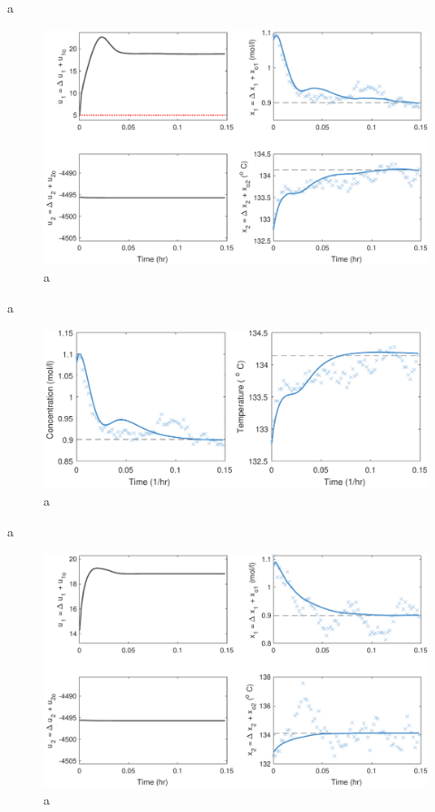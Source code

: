 \documentclass[a4paper,11pt]{book}
\numberwithin{figure}{chapter}
\numberwithin{equation}{chapter}
\numberwithin{table}{chapter}
\theoremstyle{definition}
\begin{document}
a

\begin{figure}[ht] \centering
	\includegraphics[width=\textwidth]{chapter7/lqg01}
	\caption{a}
	\label{fig:lqg01}
\end{figure}

a

\begin{figure}[ht] \centering
	\includegraphics[width=\textwidth]{chapter7/lqg02}
	\caption{a}
	\label{fig:lqg02}
\end{figure}	

a

\begin{figure}[ht] \centering
	\includegraphics[width=\textwidth]{chapter7/lqg03}
	\caption{a}
	\label{fig:lqg03}
\end{figure}
\end{document}
